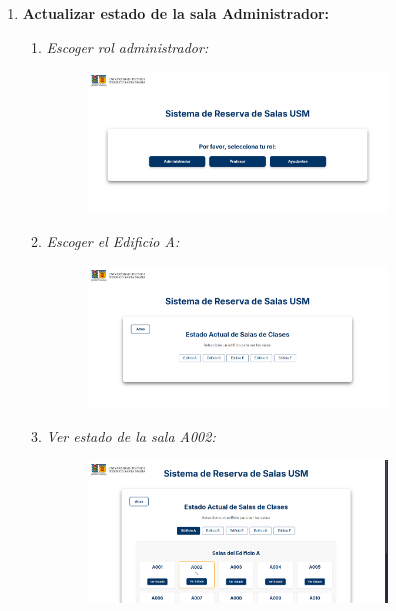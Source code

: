 \documentclass{article}
\begin{document}
\begin{enumerate}
        \item \textbf{Actualizar estado de la sala Administrador:}
        
        \begin{enumerate}
            \item \textit{Escoger rol administrador:}
            \begin{figure}[H] 
                \centering 
                \includegraphics[width=0.8\textwidth]{IMG/ss1.png} 
            \end{figure}

            \newpage
            \item \textit{Escoger el Edificio A:}
            \begin{figure}[H] 
                \centering 
                \includegraphics[width=0.8\textwidth]{IMG/ss23.png} 
            \end{figure}

            
            \item \textit{Ver estado de la sala A002:}
            \begin{figure}[H] 
                \centering 
                \includegraphics[width=0.8\textwidth]{IMG/ss24.png} 
            \end{figure}


\end{enumerate}
\end{enumerate}
\end{document}
